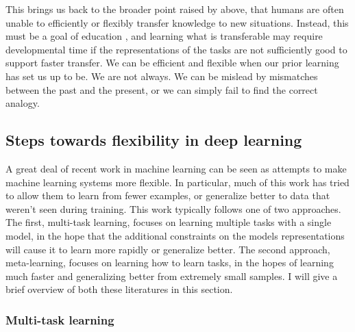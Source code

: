 \documentclass[11pt]{article}
\begin{document}
This brings us back to the broader point raised by \citet{Detterman1993} above, that humans are often unable to efficiently or flexibly transfer knowledge to new situations. Instead, this must be a goal of education \citep{Bransford1999}, and learning what is transferable may require developmental time \citep{Lampinen2017a} if the representations of the tasks are not sufficiently good to support faster transfer. We can be efficient and flexible when our prior learning has set us up to be. We are not always. We can be mislead by mismatches between the past and the present, or we can simply fail to find the correct analogy.\par

\subsection{Steps towards flexibility in deep learning}

A great deal of recent work in machine learning can be seen as attempts to make machine learning systems more flexible. In particular, much of this work has tried to allow them to learn from fewer examples, or generalize better to data that weren't seen during training. This work typically follows one of two approaches. The first, multi-task learning, focuses on learning multiple tasks with a single model, in the hope that the additional constraints on the models representations will cause it to learn more rapidly or generalize better. The second approach, meta-learning, focuses on learning how to learn tasks, in the hopes of learning much faster and generalizing better from extremely small samples. I will give a brief overview of both these literatures in this section. \par

\subsubsection{Multi-task learning}
\end{document}
